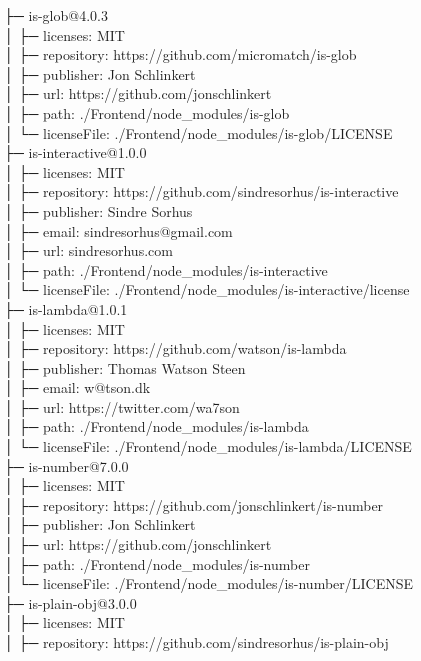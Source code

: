 ├─ is-glob@4.0.3\\
│  ├─ licenses: MIT\\
│  ├─ repository: https://github.com/micromatch/is-glob\\
│  ├─ publisher: Jon Schlinkert\\
│  ├─ url: https://github.com/jonschlinkert\\
│  ├─ path: ./Frontend/node\_modules/is-glob\\
│  └─ licenseFile: ./Frontend/node\_modules/is-glob/LICENSE\\
├─ is-interactive@1.0.0\\
│  ├─ licenses: MIT\\
│  ├─ repository: https://github.com/sindresorhus/is-interactive\\
│  ├─ publisher: Sindre Sorhus\\
│  ├─ email: sindresorhus@gmail.com\\
│  ├─ url: sindresorhus.com\\
│  ├─ path: ./Frontend/node\_modules/is-interactive\\
│  └─ licenseFile: ./Frontend/node\_modules/is-interactive/license\\
├─ is-lambda@1.0.1\\
│  ├─ licenses: MIT\\
│  ├─ repository: https://github.com/watson/is-lambda\\
│  ├─ publisher: Thomas Watson Steen\\
│  ├─ email: w@tson.dk\\
│  ├─ url: https://twitter.com/wa7son\\
│  ├─ path: ./Frontend/node\_modules/is-lambda\\
│  └─ licenseFile: ./Frontend/node\_modules/is-lambda/LICENSE\\
├─ is-number@7.0.0\\
│  ├─ licenses: MIT\\
│  ├─ repository: https://github.com/jonschlinkert/is-number\\
│  ├─ publisher: Jon Schlinkert\\
│  ├─ url: https://github.com/jonschlinkert\\
│  ├─ path: ./Frontend/node\_modules/is-number\\
│  └─ licenseFile: ./Frontend/node\_modules/is-number/LICENSE\\
├─ is-plain-obj@3.0.0\\
│  ├─ licenses: MIT\\
│  ├─ repository: https://github.com/sindresorhus/is-plain-obj\\
